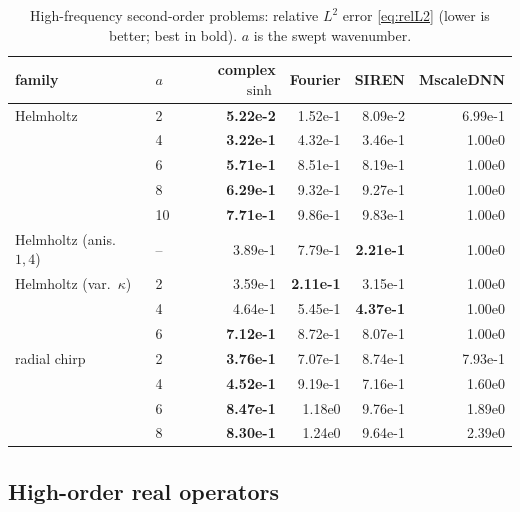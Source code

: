 \begin{table}[htbp]
\centering
\small
\caption{High-frequency second-order problems: relative \(L^2\) error
\eqref{eq:relL2} (lower is better; best in bold). \(a\) is the swept wavenumber.}
\label{tab:res-hf}
\begin{tabular}{@{}llrrrr@{}}
\toprule
family & \(a\) & complex \(\sinh\) & Fourier & SIREN & MscaleDNN \\
\midrule
Helmholtz                & 2  & \textbf{5.22e-2} & 1.52e-1 & 8.09e-2 & 6.99e-1 \\
                         & 4  & \textbf{3.22e-1} & 4.32e-1 & 3.46e-1 & 1.00e0 \\
                         & 6  & \textbf{5.71e-1} & 8.51e-1 & 8.19e-1 & 1.00e0 \\
                         & 8  & \textbf{6.29e-1} & 9.32e-1 & 9.27e-1 & 1.00e0 \\
                         & 10 & \textbf{7.71e-1} & 9.86e-1 & 9.83e-1 & 1.00e0 \\
\midrule
Helmholtz (anis.\ \(1,4\)) & -- & 3.89e-1 & 7.79e-1 & \textbf{2.21e-1} & 1.00e0 \\
\midrule
Helmholtz (var.\ \(\kappa\)) & 2 & 3.59e-1 & \textbf{2.11e-1} & 3.15e-1 & 1.00e0 \\
                         & 4  & 4.64e-1 & 5.45e-1 & \textbf{4.37e-1} & 1.00e0 \\
                         & 6  & \textbf{7.12e-1} & 8.72e-1 & 8.07e-1 & 1.00e0 \\
\midrule
radial chirp             & 2  & \textbf{3.76e-1} & 7.07e-1 & 8.74e-1 & 7.93e-1 \\
                         & 4  & \textbf{4.52e-1} & 9.19e-1 & 7.16e-1 & 1.60e0 \\
                         & 6  & \textbf{8.47e-1} & 1.18e0  & 9.76e-1 & 1.89e0 \\
                         & 8  & \textbf{8.30e-1} & 1.24e0  & 9.64e-1 & 2.39e0 \\
\bottomrule
\end{tabular}
\end{table}

\subsection{High-order real operators}\label{ssec:res-ho}

